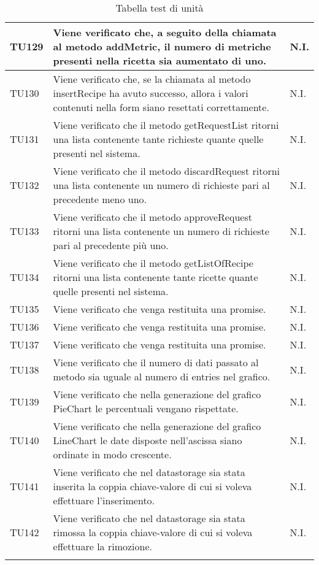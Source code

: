 \begin{center}
\begin{longtable}{| p{2cm} | p{8cm} | p{2.5cm} |}
					TU129 & Viene verificato che, a seguito della chiamata al metodo addMetric, il numero di metriche presenti nella ricetta sia aumentato di uno. & N.I.\\
					\hline
					TU130 & Viene verificato che, se la chiamata al metodo insertRecipe ha avuto successo, allora i valori contenuti nella form siano resettati correttamente. & N.I.\\
					\hline
					TU131 & Viene verificato che il metodo getRequestList ritorni una lista contenente tante richieste quante quelle presenti nel sistema. & N.I.\\
					\hline
					TU132 & Viene verificato che il metodo discardRequest ritorni una lista contenente un numero di richieste pari al precedente meno uno. & N.I.\\
					\hline
					TU133 & Viene verificato che il metodo approveRequest ritorni una lista contenente un numero di richieste pari al precedente più uno. & N.I.\\
					\hline
					TU134 & Viene verificato che il metodo getListOfRecipe ritorni una lista contenente tante ricette quante quelle presenti nel sistema. & N.I.\\
					\hline
					TU135 & Viene verificato che venga restituita una promise. & N.I.\\
					\hline
					TU136 & Viene verificato che venga restituita una promise. & N.I.\\
					\hline
					TU137 & Viene verificato che venga restituita una promise. & N.I.\\
					\hline
					TU138 & Viene verificato che il numero di dati passato al metodo sia uguale al numero di entries nel grafico. & N.I.\\
					\hline
					TU139 & Viene verificato che nella generazione del grafico PieChart le percentuali vengano rispettate. & N.I.\\
					\hline
					TU140 & Viene verificato che nella generazione del grafico LineChart le date disposte nell'ascissa siano ordinate in modo crescente. & N.I.\\
					\hline
					TU141 & Viene verificato che nel datastorage sia stata inserita la coppia chiave-valore di cui si voleva effettuare l'inserimento. & N.I.\\
					\hline
					TU142 & Viene verificato che nel datastorage sia stata rimossa la coppia chiave-valore di cui si voleva effettuare la rimozione. & N.I.\\
					\hline
					\caption{Tabella test di unità}
			\end{longtable}
			\egroup
			\end{center}
			
